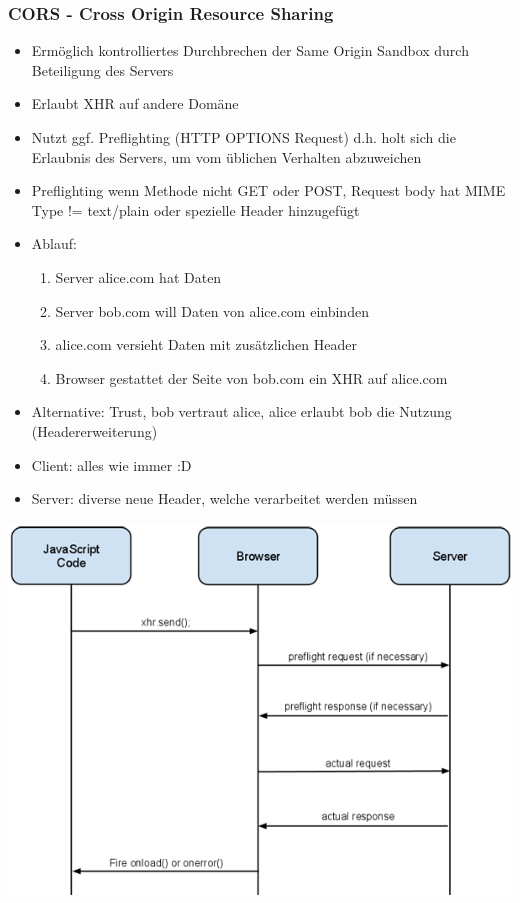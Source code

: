 \documentclass{article} %
\begin{document}
	\subsubsection{CORS - Cross Origin Resource Sharing}
	\begin{itemize}
		\item Ermöglich kontrolliertes Durchbrechen der Same Origin Sandbox durch Beteiligung des Servers
		\item Erlaubt XHR auf andere Domäne 
		\item Nutzt ggf. Preflighting (HTTP OPTIONS Request) d.h. holt sich die Erlaubnis des Servers, um vom üblichen Verhalten abzuweichen
		\item Preflighting wenn Methode nicht GET oder POST, Request body hat MIME Type != text/plain oder spezielle Header hinzugefügt
		\item Ablauf:
		\begin{enumerate}
			\item Server alice.com hat Daten
			\item Server bob.com will Daten von alice.com einbinden
			\item alice.com versieht Daten mit zusätzlichen Header
			\item Browser gestattet der Seite von bob.com ein XHR auf alice.com
		\end{enumerate}
		\item Alternative: Trust, bob vertraut alice, alice erlaubt bob die Nutzung (Headererweiterung)
		\item Client: alles wie immer :D
		\item Server: diverse neue Header, welche verarbeitet werden müssen
	\end{itemize}
	\begin{center}
		\includegraphics[scale=0.3]{img/CORS_FLOW.png}
	\end{center}
\end{document}
